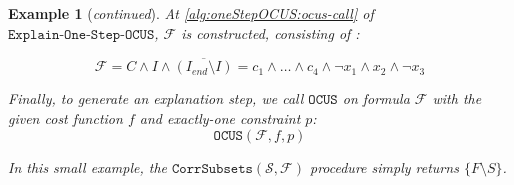 \documentclass[twoside,11pt]{article}
\newcommand\m[1]{\mathcal{#1}}
\newtheorem{example}{Example}
\newcommand\Iend{\ensuremath{I_\mathit{end} }\xspace}
\newcommand\formula{\ensuremath{\m{F} }\xspace}
\newcommand\formularunning{\ensuremath{C }\xspace}
\newcommand\mm[1]{\ensuremath{#1}\xspace}
\newcommand\call[1]{\mm{\texttt{#1}}}
\newcommand\comus{\mm{\call{OCUS}}}
\newcommand\corrsubsets{\mm{\call{CorrSubsets}}}
\newcommand\onestepo{\ensuremath{\call{Explain-One-Step-OCUS}}\xspace}
\begin{document}
\begin{example}[\textit{continued}]
At \cref{alg:oneStepOCUS:ocus-call} of \onestepo, $\m{F}$ is constructed, consisting of :

\begin{equation}
\formula = \formularunning \land I \land \overline{(\Iend\setminus I)} =  c_1 \wedge \dots \wedge c_{4} \wedge \lnot x_1 \wedge  x_2 \wedge  \lnot x_3	%
\label{eq:explain-one-step-ocus}
\end{equation}

	Finally, to generate an explanation step, we call \comus on formula $\formula$ with the given cost function $f$ and \emph{exactly-one} constraint $p$:
	\begin{equation}\comus( \formula, f, p)\end{equation}

	In this small example, the $\corrsubsets(\m{S}, \formula)$ procedure simply returns $\{F\setminus S\}$. 


\end{example}
\end{document}
